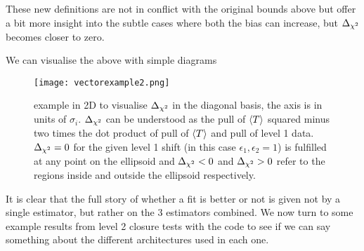 These new definitions are not in conflict with the original bounds above but
offer a bit more insight into the subtle cases where both the bias can increase,
but $\Delta_{\chi^{2}}$ becomes closer to zero.

We can visualise the above with simple diagrams
%
\begin{figure}[!h]
    \centering
    \texttt{[image: vectorexample2.png]}
    \caption{example in 2D to visualise $\Delta_{\chi^{2}}$ in the diagonal basis, the axis
    is in units of $\sigma_{i}$. $\Delta_{\chi^{2}}$ can be understood as the pull of
    $\langle T \rangle$ squared minus two times the dot product of pull of $\langle T \rangle$ and pull of
    level 1 data. $\Delta_{\chi^{2}} = 0$ for the given level 1 shift (in this case
    $\epsilon_1, \epsilon_2 = 1$) is fulfilled at any point on the ellipsoid and
    $\Delta_{\chi^{2}}<0$ and $\Delta_{\chi^{2}}>0$ refer to the regions inside and outside the ellipsoid
    respectively.}
    \label{fig:vectorexample}
\end{figure}
%
It is clear that the full story of whether a fit is better or not is given not
by a single estimator, but rather on the 3 estimators combined. We now turn to
some example results from level 2 closure tests with the \nfit code to see if we
can say something about the different architectures used in each one.

